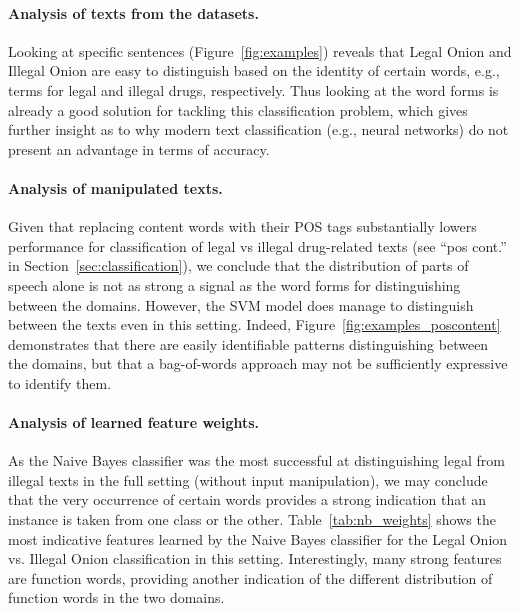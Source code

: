 \documentclass[11pt,a4paper,table]{article}
\begin{document}
  \paragraph{Analysis of texts from the datasets.}

    Looking at specific sentences (Figure~\ref{fig:examples})
    reveals that Legal Onion and Illegal Onion are easy to distinguish
    based on the identity of certain words, e.g., terms for legal and illegal drugs,
    respectively.
    Thus looking at the word forms is already a good solution for tackling this
    classification problem,
    which gives further insight as to why modern text classification (e.g., neural networks)
    do not present an advantage in     terms of accuracy.

  \paragraph{Analysis of manipulated texts.}

    Given that replacing content words with their POS tags substantially lowers
    performance for classification of legal vs illegal drug-related texts
    (see ``pos cont.'' in Section~\ref{sec:classification}),
    we conclude that the distribution of parts of speech alone is not as strong
    a signal as the word forms for distinguishing between the domains.
    However, the SVM model 
    does manage to distinguish between the texts even in this setting.
    Indeed, Figure~\ref{fig:examples_poscontent} demonstrates that
    there are easily identifiable patterns distinguishing between the domains,
    but that a bag-of-words approach may not be sufficiently expressive to identify them. 

  \paragraph{Analysis of learned feature weights.}

    As the Naive Bayes classifier was the most successful at distinguishing
    legal from illegal texts in the full setting (without input manipulation),
    we may conclude that the very occurrence of certain words provides a strong indication
    that an instance is taken from one class or the other.
    Table~\ref{tab:nb_weights} shows the most indicative features learned
    by the Naive Bayes classifier for the
    Legal Onion vs. Illegal Onion classification in this setting.
    Interestingly, many strong features are function words,
    providing another indication of the different distribution of function words in the two domains.
\end{document}
